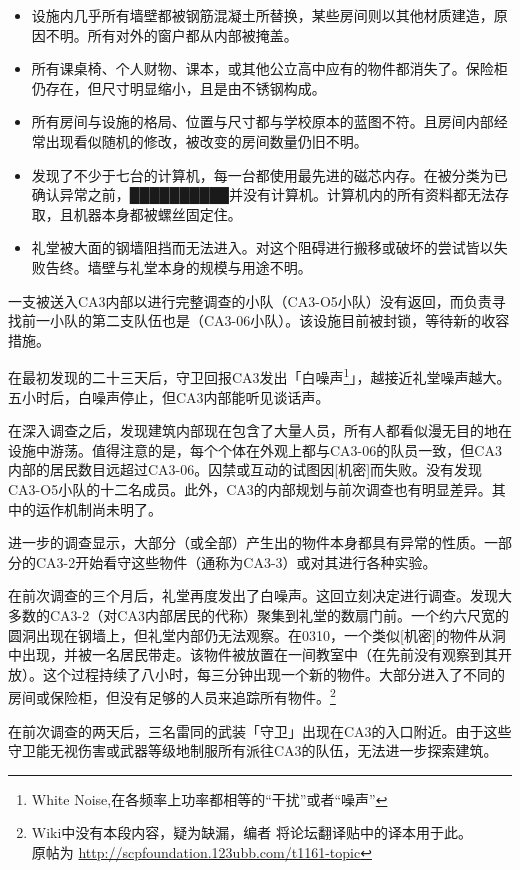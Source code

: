 \begin{itemize}
	\item 设施内几乎所有墙壁都被钢筋混凝土所替换，某些房间则以其他材质建造，原因不明。所有对外的窗户都从内部被掩盖。
	\item 所有课桌椅、个人财物、课本，或其他公立高中应有的物件都消失了。保险柜仍存在，但尺寸明显缩小，且是由不锈钢构成。
	\item 所有房间与设施的格局、位置与尺寸都与学校原本的蓝图不符。且房间内部经常出现看似随机的修改，被改变的房间数量仍旧不明。
	\item 发现了不少于七台的计算机，每一台都使用最先进的磁芯内存。在被分类为已确认异常之前，██████████并没有计算机。计算机内的所有资料都无法存取，且机器本身都被螺丝固定住。
	\item 礼堂被大面的钢墙阻挡而无法进入。对这个阻碍进行搬移或破坏的尝试皆以失败告终。墙壁与礼堂本身的规模与用途不明。
\end{itemize}

一支被送入CA3内部以进行完整调查的小队（CA3-O5小队）没有返回，而负责寻找前一小队的第二支队伍也是（CA3-06小队）。该设施目前被封锁，等待新的收容措施。

在最初发现的二十三天后，守卫回报CA3发出「白噪声\footnote{White Noise,在各频率上功率都相等的“干扰”或者“噪声”}」，越接近礼堂噪声越大。五小时后，白噪声停止，但CA3内部能听见谈话声。

在深入调查之后，发现建筑内部现在包含了大量人员，所有人都看似漫无目的地在设施中游荡。值得注意的是，每个个体在外观上都与CA3-06的队员一致，但CA3内部的居民数目远超过CA3-06。囚禁或互动的试图因[机密]而失败。没有发现CA3-O5小队的十二名成员。此外，CA3的内部规划与前次调查也有明显差异。其中的运作机制尚未明了。

进一步的调查显示，大部分（或全部）产生出的物件本身都具有异常的性质。一部分的CA3-2开始看守这些物件（通称为CA3-3）或对其进行各种实验。

在前次调查的三个月后，礼堂再度发出了白噪声。这回立刻决定进行调查。发现大多数的CA3-2（对CA3内部居民的代称）聚集到礼堂的数扇门前。一个约六尺宽的圆洞出现在钢墙上，但礼堂内部仍无法观察。在0310，一个类似[机密]的物件从洞中出现，并被一名居民带走。该物件被放置在一间教室中（在先前没有观察到其开放）。这个过程持续了八小时，每三分钟出现一个新的物件。大部分进入了不同的房间或保险柜，但没有足够的人员来追踪所有物件。\footnote{
	Wiki中没有本段内容，疑为缺漏，编者 \QIS 将论坛翻译贴中的译本用于此。\\
	原帖为 \url{http://scpfoundation.123ubb.com/t1161-topic}
}

在前次调查的两天后，三名雷同的武装「守卫」出现在CA3的入口附近。由于这些守卫能无视伤害或武器等级地制服所有派往CA3的队伍，无法进一步探索建筑。

